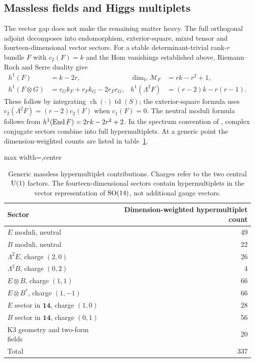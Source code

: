 \subsection{Massless fields and Higgs multiplets}
The vector gap does not make the remaining matter heavy. The full
orthogonal adjoint decomposes into endomorphism, exterior-square,
mixed tensor and fourteen-dimensional vector sectors. For a stable
determinant-trivial rank-$r$ bundle $F$ with $c_2(F)=k$ and the
Hom vanishings established above, Riemann--Roch and Serre duality give
\begin{align}\label{eq:cohomology}
 h^1(F)&=k-2r,&
 \dim_{\mathbb H}\mathcal M_F&=rk-r^2+1,\\
 h^1(F\otimes G)&=r_Gk_F+r_Fk_G-2r_Fr_G,&
 h^1(\Lambda^2F)&=(r-2)k-r(r-1).\nonumber
\end{align}
These follow by integrating $\operatorname{ch}(\cdot)\operatorname{td}(S)$;
the exterior-square formula uses
$c_2(\Lambda^2F)=(r-2)c_2(F)$ when $c_1(F)=0$.
The neutral moduli formula follows from $h^1(\operatorname{End} F)=2rk-2r^2+2$.
In the spectrum convention of \cite{honecker}, complex conjugate
sectors combine into full hypermultiplets. At a generic point the
dimension-weighted counts are listed in table~\ref{tab:matter}.

\begin{table}[t]
\centering
\caption{Generic massless hypermultiplet contributions. Charges refer to
the two central $\operatorname{U}(1)$ factors. The fourteen-dimensional sectors contain
hypermultiplets in the vector representation of $\operatorname{SO}(14)$, not additional
gauge vectors.}\label{tab:matter}
\begin{adjustbox}{max width=\textwidth,center}
\begin{tabular}{lr}
\toprule
Sector & Dimension-weighted hypermultiplet count\\
\midrule
$E$ moduli, neutral &49\\
$B$ moduli, neutral &22\\
$\Lambda^2E$, charge $(2,0)$ &26\\
$\Lambda^2B$, charge $(0,2)$ &4\\
$E\otimes B$, charge $(1,1)$ &66\\
$E\otimes B^*$, charge $(1,-1)$ &66\\
$E$ sector in $\mathbf {14}$, charge $(1,0)$ &28\\
$B$ sector in $\mathbf {14}$, charge $(0,1)$ &56\\
K3 geometry and two-form fields &20\\
\midrule
Total &337\\
\bottomrule
\end{tabular}
\end{adjustbox}
\end{table}

